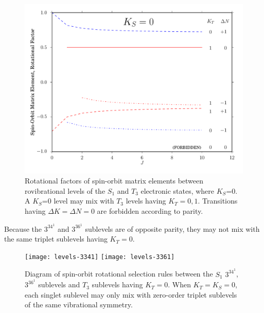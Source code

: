 \documentclass[12pt]{mitthesis}
\begin{document}
\begin{figure}
  \caption{Rotational factors of spin-orbit matrix elements between
    rovibrational levels of the $S_1$ and $T_3$ electronic states,
    where $K_S$=0.  A $K_S$=0 level may mix with $T_3$ levels having
    $K_T=0,1$.  Transitions having $\Delta K = \Delta N = 0$ are
    forbidden according to parity.}
  \centering
  \includegraphics[width=6in]{rotational-factors-k0.pdf}
\end{figure}


Because the $3^34^1$ and $3^36^1$  sublevels are of opposite
parity, they may not mix with the same triplet sublevels having
$K_T=0$.






\begin{figure}
  \caption{Diagram of spin-orbit rotational selection rules between
    the $S_1$ $3^34^1$, $3^36^1$  sublevels and $T_3$ sublevels
    having $K_T=0$.  When $K_T=K_S=0$, each singlet sublevel may only
    mix with zero-order triplet sublevels of the same vibrational
    symmetry.}
  \label{fig:levels-k0}
  \centering

  \texttt{[image: levels-3341]}
  \texttt{[image: levels-3361]}  
\end{figure}
\end{document}
